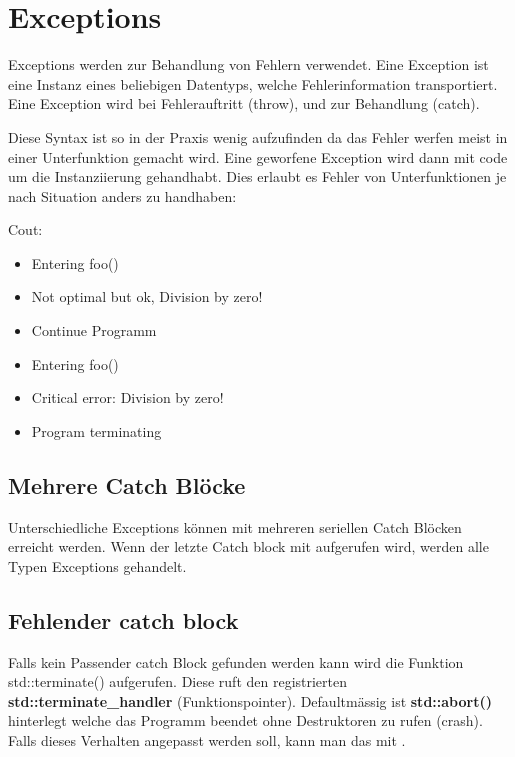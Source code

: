\section{Exceptions}

Exceptions werden zur Behandlung von Fehlern verwendet. 
Eine Exception ist eine Instanz eines beliebigen Datentyps, welche Fehlerinformation transportiert. 
Eine Exception wird bei Fehlerauftritt  (throw), und zur Behandlung  (catch).




Diese Syntax ist so in der Praxis wenig aufzufinden da das Fehler werfen meist in einer Unterfunktion gemacht wird. 
Eine geworfene Exception wird dann mit code um die Instanziierung gehandhabt. 
Dies erlaubt es Fehler von Unterfunktionen je nach Situation anders zu handhaben:



Cout:

\begin{itemize}[itemsep=1pt, parsep=0pt]
    \item Entering foo()
    \item Not optimal but ok, Division by zero!
    \item Continue Programm
    \item Entering foo()
    \item Critical error: Division by zero!
    \item Program terminating
\end{itemize}

\subsection{Mehrere Catch Blöcke}

Unterschiedliche Exceptions können mit mehreren seriellen Catch Blöcken erreicht werden. 
Wenn der letzte Catch block mit  aufgerufen wird, werden alle Typen Exceptions gehandelt. 

\nextcol



\subsection{Fehlender catch block}

Falls kein Passender catch Block gefunden werden kann wird die Funktion std::terminate() aufgerufen. 
Diese ruft den registrierten \textbf{std::terminate\_handler} (Funktionspointer). 
Defaultmässig ist \textbf{std::abort()} hinterlegt welche das Programm beendet ohne Destruktoren zu rufen (crash).
Falls dieses Verhalten angepasst werden soll, kann man das mit .


